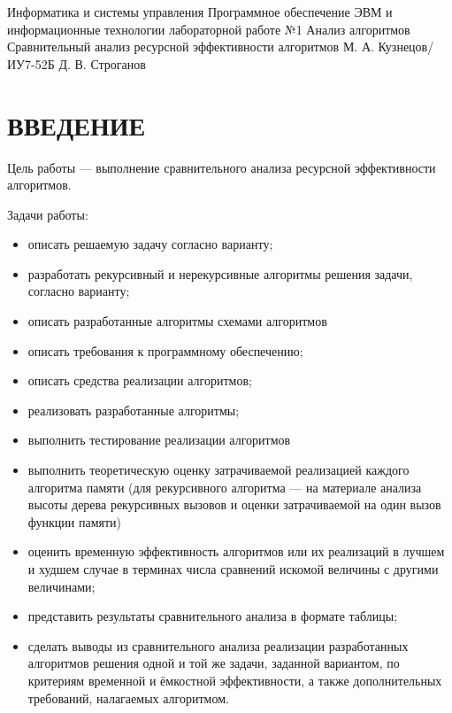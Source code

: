 \documentclass{bmstu}
\begin{document}
\makereporttitle
{Информатика и системы управления}
{Программное обеспечение ЭВМ и информационные технологии}
{лабораторной работе №1}
{Анализ алгоритмов}
{Сравнительный анализ ресурсной эффективности алгоритмов}
{} %
{М. А. Кузнецов/ИУ7-52Б} %
{Д. В. Строганов}

\maketableofcontents

\chapter*{ВВЕДЕНИЕ}

Цель работы --- выполнение сравнительного анализа ресурсной
эффективности алгоритмов.

Задачи работы:

\renewcommand{\labelitemi}{---}
\begin{itemize}
	\item описать решаемую задачу согласно варианту;
	\item разработать рекурсивный и нерекурсивные алгоритмы решения задачи,
	      согласно варианту;
	\item описать разработанные алгоритмы схемами алгоритмов
	\item описать требования к программному обеспечению;
	\item описать средства реализации алгоритмов;
	\item реализовать разработанные алгоритмы;
	\item выполнить тестирование реализации алгоритмов
	\item выполнить теоретическую оценку затрачиваемой реализацией каждого
	      алгоритма памяти (для рекурсивного алгоритма — на материале анализа
	      высоты дерева рекурсивных вызовов и оценки затрачиваемой на один
	      вызов функции памяти)
	\item  оценить временную эффективность алгоритмов или их реализаций в лучшем
	      и худшем случае в терминах числа сравнений искомой величины
	      с другими величинами;
	\item представить результаты сравнительного анализа в формате таблицы;
	\item сделать выводы из сравнительного анализа реализации разработанных
	      алгоритмов решения одной и той же задачи, заданной вариантом, по
	      критериям временной и ёмкостной эффективности, а также дополнительных
	      требований, налагаемых алгоритмом.
\end{itemize}
\end{document}

